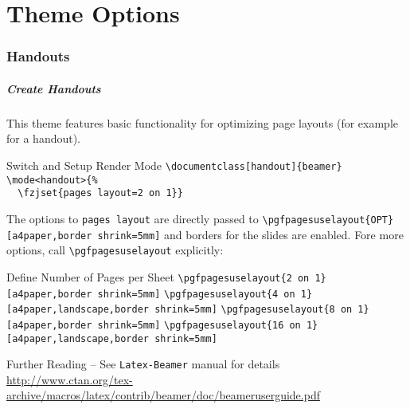 %
\part{Theme Options}
\makepart
\section{Handouts}
\begin{frame}[fragile,label=handouts,t]
        \frametitle{Create Handouts}
        This theme features basic functionality for optimizing page layouts (for example for a handout).
        \begin{block}{Switch and Setup Render Mode}
     \scriptsize
                \verb+\documentclass[handout]{beamer}+\\
                        \verb+\mode<handout>{%+\\
                        \verb+  \fzjset{pages layout=2 on 1}}+
    \end{block}
        The options to \verb+pages layout+ are directly passed to \verb+\pgfpagesuselayout{OPT}[a4paper,border shrink=5mm]+ and borders for the slides are enabled. Fore more options, call \verb+\pgfpagesuselayout+ explicitly:

        \begin{block}{Define Number of Pages per Sheet}
        \scriptsize
        \verb+\pgfpagesuselayout{2 on 1}[a4paper,border shrink=5mm]+
        \verb+\pgfpagesuselayout{4 on 1}[a4paper,landscape,border shrink=5mm]+
        \verb+\pgfpagesuselayout{8 on 1}[a4paper,border shrink=5mm]+
        \verb+\pgfpagesuselayout{16 on 1}[a4paper,landscape,border shrink=5mm]+
    \end{block}
        \begin{block}{Further Reading -- See {\tt Latex-Beamer} manual for details}
        {\scriptsize
        \url{http://www.ctan.org/tex-archive/macros/latex/contrib/beamer/doc/beameruserguide.pdf}}
    \end{block}
\end{frame}
